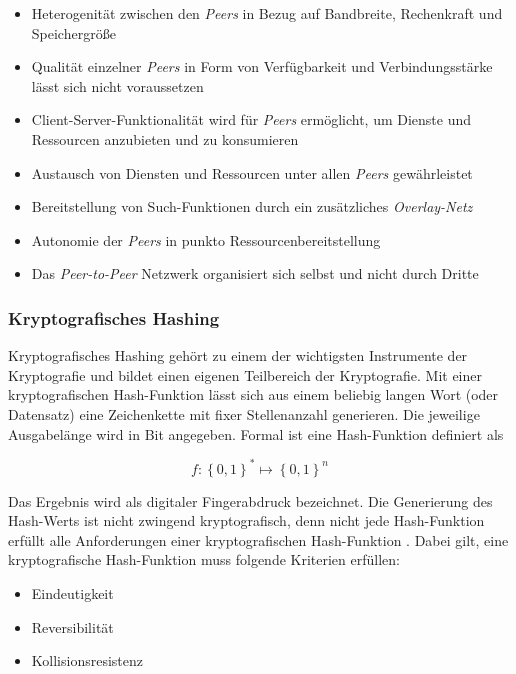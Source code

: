 \begin{itemize}
  \item Heterogenität zwischen den \textit{Peers} in Bezug auf Bandbreite, Rechenkraft und Speichergröße
  \item Qualität einzelner \textit{Peers} in Form von Verfügbarkeit und Verbindungsstärke lässt sich nicht voraussetzen
  \item Client-Server-Funktionalität wird für \textit{Peers} ermöglicht, um Dienste und Ressourcen anzubieten und zu konsumieren
  \item Austausch von Diensten und Ressourcen unter allen \textit{Peers} gewährleistet
  \item Bereitstellung von Such-Funktionen durch ein zusätzliches \textit{Overlay-Netz}
  \item Autonomie der \textit{Peers} in punkto Ressourcenbereitstellung
  \item Das \textit{Peer-to-Peer} Netzwerk organisiert sich selbst und nicht durch Dritte
\end{itemize}

\subsubsection{Kryptografisches Hashing}
Kryptografisches Hashing gehört zu einem der wichtigsten Instrumente der Kryptografie und bildet einen eigenen Teilbereich der Kryptografie. Mit einer kryptografischen Hash-Funktion lässt sich aus einem beliebig langen Wort (oder Datensatz) eine Zeichenkette mit fixer Stellenanzahl generieren. Die jeweilige Ausgabelänge wird in Bit angegeben. Formal ist eine Hash-Funktion definiert als \clearpage

\begin{equation}
	f:\left \{ 0,1 \right \}^{*} \mapsto \left \{ 0,1 \right \}^{n}
\end{equation}

\noindent
Das Ergebnis wird als digitaler Fingerabdruck bezeichnet. Die Generierung des Hash-Werts ist nicht zwingend kryptografisch, denn nicht jede Hash-Funktion erfüllt alle Anforderungen einer kryptografischen Hash-Funktion \citep{Menezes1997, Diffie1976}. Dabei gilt, eine kryptografische Hash-Funktion muss folgende Kriterien erfüllen:

\begin{itemize}
	\item Eindeutigkeit
	\item Reversibilität
	\item Kollisionsresistenz
\end{itemize}

